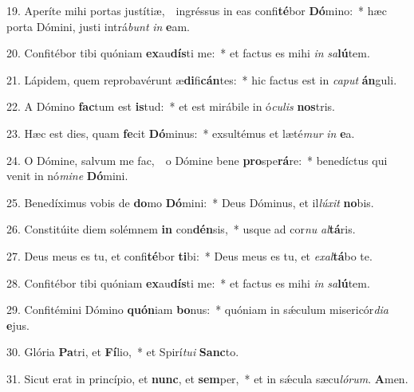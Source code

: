 19. Aperíte mihi portas justítiæ,~\GreDagger\ ingréssus in eas confi\textbf{té}bor \textbf{Dó}mino:~* hæc porta Dómini, justi intrá\textit{bunt} \textit{in} \textbf{e}am.

20. Confitébor tibi quóniam \textbf{ex}au\textbf{dís}ti me:~* et factus es mihi \textit{in} \textit{sa}\textbf{lú}tem.

21. Lápidem, quem reprobavérunt æ\textbf{di}fi\textbf{cán}tes:~* hic factus est in \textit{ca}\textit{put} \textbf{án}guli.

22. A Dómino \textbf{fac}tum est \textbf{is}tud:~* et est mirábile in ó\textit{cu}\textit{lis} \textbf{nos}tris.

23. Hæc est dies, quam \textbf{fe}cit \textbf{Dó}minus:~* exsultémus et læté\textit{mur} \textit{in} \textbf{e}a.

24. O Dómine, salvum me fac,~\GreDagger\ o Dómine bene \textbf{pro}spe\textbf{rá}re:~* benedíctus qui venit in nó\textit{mi}\textit{ne} \textbf{Dó}mini.

25. Benedíximus vobis de \textbf{do}mo \textbf{Dó}mini:~* Deus Dóminus, et il\textit{lú}\textit{xit} \textbf{no}bis.

26. Constitúite diem solémnem \textbf{in} con\textbf{dén}sis,~* usque ad cor\textit{nu} \textit{al}\textbf{tá}ris.

27. Deus meus es tu, et confi\textbf{té}bor \textbf{ti}bi:~* Deus meus es tu, et \textit{ex}\textit{al}\textbf{tá}bo te.

28. Confitébor tibi quóniam \textbf{ex}au\textbf{dís}ti me:~* et factus es mihi \textit{in} \textit{sa}\textbf{lú}tem.

29. Confitémini Dómino \textbf{quón}iam \textbf{bo}nus:~* quóniam in s\'{\ae}culum misericór\textit{di}\textit{a} \textbf{e}jus.

30. Glória \textbf{Pa}tri, et \textbf{Fí}lio,~* et Spirí\textit{tu}\textit{i} \textbf{Sanc}to.

31. Sicut erat in princípio, et \textbf{nunc}, et \textbf{sem}per,~* et in s\'{\ae}cula sæcu\textit{ló}\textit{rum}. \textbf{A}men.